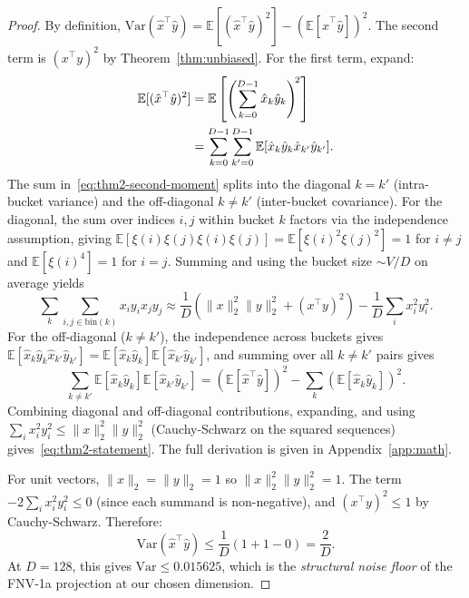 \documentclass[10pt,twocolumn]{article}
\theoremstyle{definition}
\theoremstyle{remark}
\begin{document}
\begin{proof}
By definition, $\mathrm{Var}(\hat{x}^\top \hat{y}) = \mathbb{E}[(\hat{x}^\top
\hat{y})^2] - (\mathbb{E}[\hat{x}^\top \hat{y}])^2$. The second term is
$(x^\top y)^2$ by Theorem~\ref{thm:unbiased}. For the first term,
expand:
\begin{align}
\mathbb{E}[(\hat{x}^\top \hat{y})^2]
  &= \mathbb{E}\left[ \left(\sum_{k=0}^{D-1} \hat{x}_k \hat{y}_k\right)^{\!2} \right] \notag\\
  &= \sum_{k=0}^{D-1} \sum_{k'=0}^{D-1}
       \mathbb{E}[\hat{x}_k \hat{y}_k \hat{x}_{k'} \hat{y}_{k'}].
\label{eq:thm2-second-moment}
\end{align}
The sum in~\eqref{eq:thm2-second-moment} splits into the diagonal $k =
k'$ (intra-bucket variance) and the off-diagonal $k \neq k'$
(inter-bucket covariance). For the diagonal, the sum over indices $i,
j$ within bucket $k$ factors via the independence assumption, giving
$\mathbb{E}[\xi(i) \xi(j) \xi(i) \xi(j)] = \mathbb{E}[\xi(i)^2
\xi(j)^2] = 1$ for $i \neq j$ and $\mathbb{E}[\xi(i)^4] = 1$ for $i =
j$. Summing and using the bucket size $\sim V/D$ on average yields
\begin{equation}
\sum_{k} \sum_{i,j \in \mathrm{bin}(k)} x_i y_i x_j y_j
  \approx \frac{1}{D}\left( \|x\|_2^2 \|y\|_2^2 + (x^\top y)^2 \right)
  - \frac{1}{D}\sum_i x_i^2 y_i^2.
\end{equation}
For the off-diagonal ($k \neq k'$), the independence across buckets
gives $\mathbb{E}[\hat{x}_k \hat{y}_k \hat{x}_{k'} \hat{y}_{k'}] =
\mathbb{E}[\hat{x}_k \hat{y}_k] \mathbb{E}[\hat{x}_{k'} \hat{y}_{k'}]$,
and summing over all $k \neq k'$ pairs gives
\begin{equation}
\sum_{k \neq k'} \mathbb{E}[\hat{x}_k \hat{y}_k] \mathbb{E}[\hat{x}_{k'} \hat{y}_{k'}]
  = \left( \mathbb{E}[\hat{x}^\top \hat{y}] \right)^2 - \sum_k (\mathbb{E}[\hat{x}_k \hat{y}_k])^2.
\end{equation}
Combining diagonal and off-diagonal contributions, expanding, and using
$\sum_i x_i^2 y_i^2 \le \|x\|_2^2 \|y\|_2^2$ (Cauchy-Schwarz on the
squared sequences) gives~\eqref{eq:thm2-statement}. The full derivation
is given in Appendix~\ref{app:math}.

For unit vectors, $\|x\|_2 = \|y\|_2 = 1$ so $\|x\|_2^2 \|y\|_2^2 = 1$.
The term $-2 \sum_i x_i^2 y_i^2 \le 0$ (since each summand is
non-negative), and $(x^\top y)^2 \le 1$ by Cauchy-Schwarz. Therefore:
\begin{equation}
\mathrm{Var}(\hat{x}^\top \hat{y})
  \le \frac{1}{D}(1 + 1 - 0) = \frac{2}{D}.
\end{equation}
At $D = 128$, this gives $\mathrm{Var} \le 0.015625$, which is the
\emph{structural noise floor} of the FNV-1a projection at our chosen
dimension. \qedhere
\end{proof}
\end{document}
